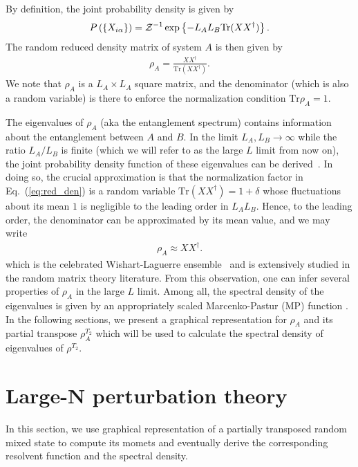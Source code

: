 \documentclass[aps,pra,groupedaddress,twocolumn,notitlepage,superscriptaddress,10pt]{revtex4-1}
\newcommand{\rT}{{\rho^{T_2}} }
\newcommand{\Tr}{\text{Tr}}
\newcommand{\tr}{\text{Tr}}
\begin{document}
By definition, the joint probability density is given by
\begin{align}
    \label{eq:Xprob}
    P\left( \{X_{i\alpha} \} \right) = {\cal Z}^{-1} \exp \left\{- L_A L_B \Tr(XX^\dag) \right\}.
\end{align}
The random reduced density matrix of system $A$ is then given by
\begin{align}
\label{eq:red_den}
\rho_{A}=\frac{XX^{\dag}}{\tr (X X^\dag)}.
\end{align}
We note that $\rho_A$ is a $L_A \times L_A$ square matrix, and  the denominator (which is also a random variable) is there to enforce the normalization condition $\Tr \rho_A=1$.


The eigenvalues of $\rho_A$ (aka the entanglement spectrum) contains information about the entanglement between $A$ and $B$. In the limit $L_A, L_B \to \infty$ while the ratio $L_A/L_B$ is finite (which we will refer to as the large $L$ limit from now on), 
the joint probability density function of these eigenvalues can be derived~\cite{Lloyd1988, Zyczkowski2001}. In doing so, the crucial approximation is that the normalization factor in Eq.~(\ref{eq:red_den}) is a random variable $\Tr (XX^\dag)= 1+ \delta$ whose fluctuations about its mean $1$ is negligible to the leading order in $L_A L_B$. Hence, to the leading order, the denominator can be approximated by its mean value, and we may write
\begin{align}
 \rho_A \approx XX^\dag.
 \label{eq:Wishart}
\end{align}
 which is the celebrated  Wishart-Laguerre ensemble~\cite{Forrester} and is extensively studied in the random matrix theory literature. From this observation, one can infer several properties of $\rho_A$ in the large $L$ limit. Among all, the spectral density of the eigenvalues is given by an appropriately scaled Marcenko-Pastur (MP) function \cite{Forrester}. In the following sections, we present a graphical representation for $\rho_A$ and its partial transpose $\rho_A^{T_2}$ which will be used to calculate the spectral density of eigenvalues of $\rT$.

\section{Large-N perturbation theory}
In this section, we use graphical representation of a partially transposed random mixed state to  compute its momets  and eventually derive the corresponding resolvent function and the spectral density.
\end{document}
